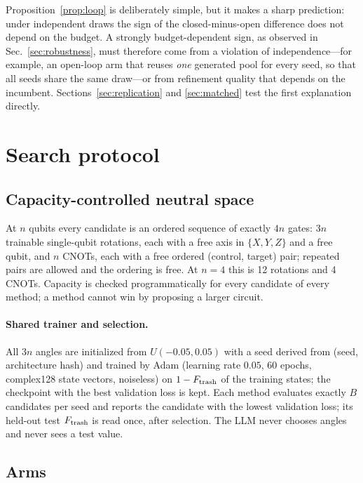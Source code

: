 \documentclass[11pt]{article}
\begin{document}
Proposition~\ref{prop:loop} is deliberately simple, but it makes a sharp
prediction: under independent draws the sign of the closed-minus-open difference does
not depend on the budget. A strongly budget-dependent sign, as observed in
Sec.~\ref{sec:robustness}, must therefore come from a violation of independence---for
example, an open-loop arm that reuses \emph{one} generated pool for every seed, so
that all seeds share the same draw---or from refinement quality that depends on the
incumbent. Sections~\ref{sec:replication} and \ref{sec:matched} test the first
explanation directly.

\section{Search protocol}
\label{sec:protocol}

\subsection{Capacity-controlled neutral space}

At $n$ qubits every candidate is an ordered sequence of exactly $4n$ gates: $3n$
trainable single-qubit rotations, each with a free axis in $\{X,Y,Z\}$ and a free qubit,
and $n$ CNOTs, each with a free ordered (control, target) pair; repeated pairs are
allowed and the ordering is free.
At $n=4$ this is 12 rotations and 4 CNOTs.
Capacity is checked programmatically for every candidate of every method; a method
cannot win by proposing a larger circuit.

\paragraph{Shared trainer and selection.}
All $3n$ angles are initialized from $U(-0.05,0.05)$ with a seed derived from
(seed, architecture hash) and trained by Adam (learning rate $0.05$, 60 epochs,
complex128 state vectors, noiseless) on $1-F_{\rm trash}$ of the training states;
the checkpoint with the best validation loss is kept.
Each method evaluates exactly $B$ candidates per seed and reports the candidate with
the lowest validation loss; its held-out test $F_{\rm trash}$ is read once, after
selection. The LLM never chooses angles and never sees a test value.

\subsection{Arms}
\end{document}
